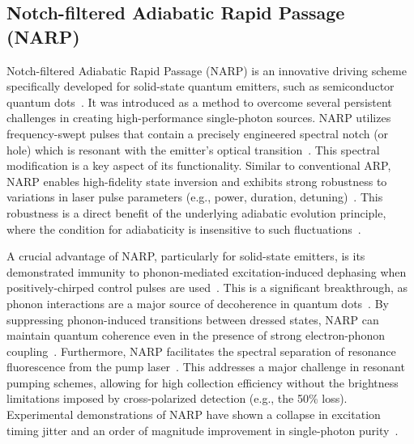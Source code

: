 \documentclass{article}
\begin{document}
\subsection*{Notch-filtered Adiabatic Rapid Passage (NARP)}
Notch-filtered Adiabatic Rapid Passage (NARP) is an innovative driving scheme specifically developed for solid-state quantum emitters, such as semiconductor quantum dots~\cite{Wilbur2022NotchfilteredAR}. It was introduced as a method to overcome several persistent challenges in creating high-performance single-photon sources. NARP utilizes frequency-swept pulses that contain a precisely engineered spectral notch (or hole) which is resonant with the emitter's optical transition~\cite{Wilbur2022NotchfilteredAR}. This spectral modification is a key aspect of its functionality. Similar to conventional ARP, NARP enables high-fidelity state inversion and exhibits strong robustness to variations in laser pulse parameters (e.g., power, duration, detuning)~\cite{Wilbur2022NotchfilteredAR}. This robustness is a direct benefit of the underlying adiabatic evolution principle, where the condition for adiabaticity is insensitive to such fluctuations~\cite{Wilbur2022NotchfilteredAR}.

A crucial advantage of NARP, particularly for solid-state emitters, is its demonstrated immunity to phonon-mediated excitation-induced dephasing when positively-chirped control pulses are used~\cite{Wilbur2022NotchfilteredAR}. This is a significant breakthrough, as phonon interactions are a major source of decoherence in quantum dots~\cite{Lker2019ARO}. By suppressing phonon-induced transitions between dressed states, NARP can maintain quantum coherence even in the presence of strong electron-phonon coupling~\cite{Wilbur2022NotchfilteredAR}. Furthermore, NARP facilitates the spectral separation of resonance fluorescence from the pump laser~\cite{Wilbur2022NotchfilteredAR}. This addresses a major challenge in resonant pumping schemes, allowing for high collection efficiency without the brightness limitations imposed by cross-polarized detection (e.g., the 50\% loss). Experimental demonstrations of NARP have shown a collapse in excitation timing jitter and an order of magnitude improvement in single-photon purity~\cite{Karli2024RobustSG, Bracht2024SolidstateQE}.
\end{document}
